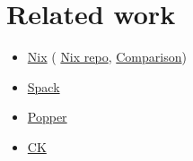 \section{Related work}

\begin{itemize}
  \item \href{https://nixos.org}{Nix} (
    \href{https://github.com/nixos/nix}{Nix repo},
    \href{./Comparison.md#Pylightnix-vs-Nix}{Comparison})
  \item \href{https://spack.io}{Spack}
  \item \href{https://falsifiable.us}{Popper}
  \item \href{https://cknowledge.org}{CK}
\end{itemize}



